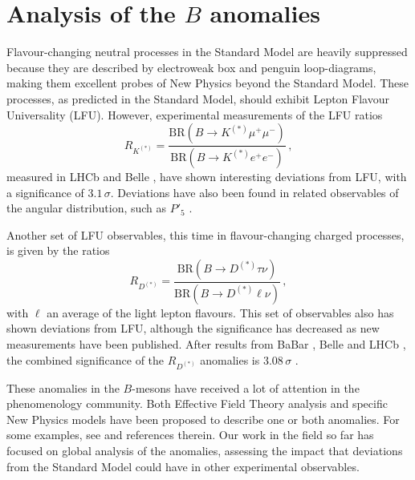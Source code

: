\documentclass[combined.tex]{subfiles}
\begin{document}
\section{Analysis of the $B$ anomalies}
Flavour-changing neutral processes in the Standard Model are heavily suppressed because they are described by electroweak box and penguin loop-diagrams, making them excellent probes of New Physics beyond the Standard Model. These processes, as predicted in the Standard Model, should exhibit Lepton Flavour Universality (LFU). However, experimental measurements of the LFU ratios
\begin{equation}
R_{K^{(*)}} = \frac{\mathrm{BR}(B\to K^{(*)}\mu^+ \mu^-)}{\mathrm{BR}(B\to K^{(*)}e^+ e^-)}\,,
\end{equation}
measured in LHCb \cite{LHCb:2014vgu,LHCb:2017avl,LHCb:2019hip,LHCb:2021trn,LHCb:2021lvy} and Belle \cite{Belle:2019oag,BELLE:2019xld}, have shown interesting deviations from LFU, with a significance of $3.1\,\sigma$\cite{LHCb:2021trn}. Deviations have also been found in related observables of the angular distribution, such as $P'_5$ \cite{LHCb:2013ghj,LHCb:2014cxe,LHCb:2015svh,LHCb:2016ykl,LHCb:2020lmf,Belle:2016xuo,Belle:2016fev}.

Another set of LFU observables, this time in flavour-changing charged processes, is given by the ratios
\begin{equation}
R_{D^{(*)}} = \frac{\mathrm{BR}(B\to D^{(*)} \tau \nu)}{\mathrm{BR}(B\to D^{(*)} \ell \nu)}\,,
\end{equation}
with $\ell$ an average of the light lepton flavours. This set of observables also has shown deviations from LFU, although the significance has decreased as new measurements have been published. After results from BaBar \cite{BaBar:2012obs}, Belle \cite{Belle:2009xqm,Belle:2015qfa,Belle:2016dyj,Belle:2019gij} and LHCb \cite{LHCb:2015gmp,LHCb:2017smo}, the combined significance of the $R_{D^{(*)}}$ anomalies is $3.08\,\sigma$ \cite{HFLAV:2019otj}.

These anomalies in the $B$-mesons have received a lot of attention in the phenomenology community. Both Effective Field Theory analysis and specific New Physics models have been proposed to describe one or both anomalies. For some examples, see \cite{Alda:2018mfy,Alda:2020okk,Alda:2021ruz,Alda:2021rgt,Alda:2021krg} and references therein. Our work in the field so far has focused on global analysis of the anomalies, assessing the impact that deviations from the Standard Model could have in other experimental observables.
\end{document}
